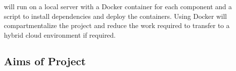 \documentclass[../CHEFCookingHelperForEveryonesFridge.tex]{subfiles}
\begin{document}

\chef{} will run on a local server with a Docker container for each component and a script to install dependencies and deploy the containers.
Using Docker will compartmentalize the project and reduce the work required to transfer to a hybrid cloud environment if required.

\subsection{Aims of Project}
\end{document}
